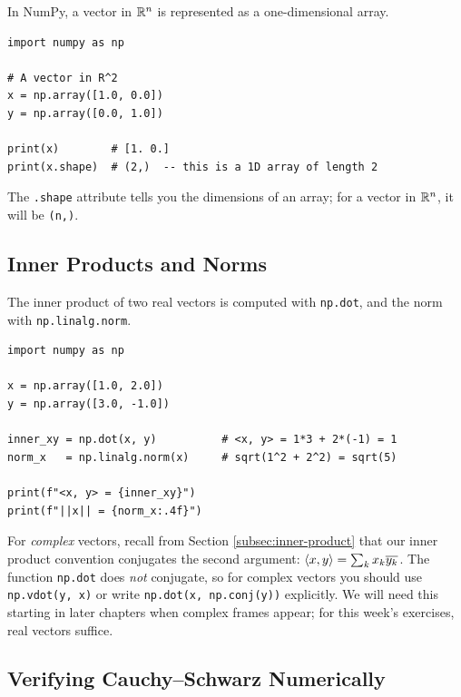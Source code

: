 In NumPy, a vector in $\mathbb{R}^n$ is represented as a one-dimensional array.

\begin{lstlisting}[caption={Creating and inspecting vectors}]
import numpy as np

# A vector in R^2
x = np.array([1.0, 0.0])
y = np.array([0.0, 1.0])

print(x)        # [1. 0.]
print(x.shape)  # (2,)  -- this is a 1D array of length 2
\end{lstlisting}

The \texttt{.shape} attribute tells you the dimensions of an array; for a vector in $\mathbb{R}^n$, it will be \texttt{(n,)}.

\subsection{Inner Products and Norms}
\label{subsec:inner-products-numpy}

The inner product of two real vectors is computed with \texttt{np.dot}, and the norm with \texttt{np.linalg.norm}.

\begin{lstlisting}[caption={Computing inner products and norms}]
import numpy as np

x = np.array([1.0, 2.0])
y = np.array([3.0, -1.0])

inner_xy = np.dot(x, y)          # <x, y> = 1*3 + 2*(-1) = 1
norm_x   = np.linalg.norm(x)     # sqrt(1^2 + 2^2) = sqrt(5)

print(f"<x, y> = {inner_xy}")
print(f"||x|| = {norm_x:.4f}")
\end{lstlisting}

\begin{remark*}
For \emph{complex} vectors, recall from Section \ref{subsec:inner-product} that our inner product convention conjugates the second argument: $\left\langle x, y \right\rangle = \sum_k x_k \overline{y_k}$. The function \texttt{np.dot} does \emph{not} conjugate, so for complex vectors you should use \texttt{np.vdot(y, x)} or write \texttt{np.dot(x, np.conj(y))} explicitly. We will need this starting in later chapters when complex frames appear; for this week's exercises, real vectors suffice.
\end{remark*}

\subsection{Verifying Cauchy--Schwarz Numerically}
\label{subsec:verify-cs}

